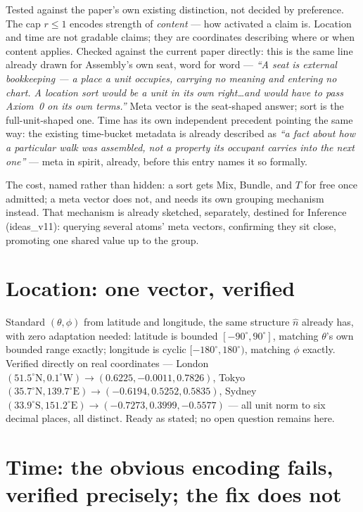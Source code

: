 \documentclass[11pt]{article}
\begin{document}
Tested against the paper's own existing distinction, not decided by
preference. The cap $r\le1$ encodes strength of \emph{content} ---
how activated a claim is. Location and time are not gradable claims;
they are coordinates describing where or when content applies.
Checked against the current paper directly: this is the same line
already drawn for Assembly's own seat, word for word --- \emph{``A
seat is external bookkeeping --- a place a unit occupies, carrying
no meaning and entering no chart. A location sort would be a unit in
its own right\ldots and would have to pass Axiom~0 on its own
terms.''} Meta vector is the seat-shaped answer; sort is the
full-unit-shaped one. Time has its own independent precedent
pointing the same way: the existing time-bucket metadata is already
described as \emph{``a fact about how a particular walk was
assembled, not a property its occupant carries into the next
one''} --- meta in spirit, already, before this entry names it so
formally.

The cost, named rather than hidden: a sort gets Mix, Bundle, and $T$
for free once admitted; a meta vector does not, and needs its own
grouping mechanism instead. That mechanism is already sketched,
separately, destined for Inference (ideas\_v11): querying several
atoms' meta vectors, confirming they sit close, promoting one shared
value up to the group.

\section{Location: one vector, verified}

Standard $(\theta,\phi)$ from latitude and longitude, the same
structure $\hat n$ already has, with zero adaptation needed: latitude
is bounded $[-90^\circ,90^\circ]$, matching $\theta$'s own bounded
range exactly; longitude is cyclic $[-180^\circ,180^\circ)$, matching
$\phi$ exactly. Verified directly on real coordinates --- London
$(51.5^\circ\text{N},0.1^\circ\text{W})\to(0.6225,-0.0011,0.7826)$,
Tokyo $(35.7^\circ\text{N},139.7^\circ\text{E})\to
(-0.6194,0.5252,0.5835)$, Sydney
$(33.9^\circ\text{S},151.2^\circ\text{E})\to
(-0.7273,0.3999,-0.5577)$ --- all unit norm to six decimal places,
all distinct. Ready as stated; no open question remains here.

\section{Time: the obvious encoding fails, verified precisely; the
fix does not}
\end{document}
